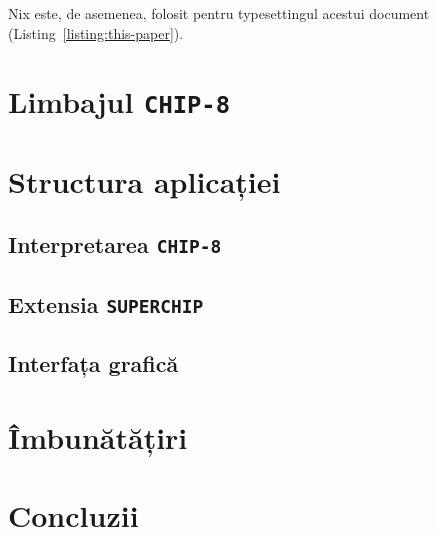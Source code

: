 \documentclass[a4paper]{article}
\begin{document}
\begin{listing}
  \inputminted{nix}{codeblocks/paper.nix}
  \caption{Derivația acestui document \LaTeX}
  \label{listing:this-paper}
\end{listing}

Nix este, de asemenea, folosit pentru typesettingul acestui document (Listing~\ref{listing:this-paper}).

\section{Limbajul \texttt{CHIP-8}}

\section{Structura aplicației}
\subsection{Interpretarea \texttt{CHIP-8}}
\subsection{Extensia \texttt{SUPERCHIP}}
\subsection{Interfața grafică}

\section{Îmbunătățiri}

\section{Concluzii}

\newpage
\printbibliography[title=\section{Bibliografie}]

\renewcommand\listoflistingscaption{\section{Listinguri de cod sursă}}
\listoflistings
\end{document}
